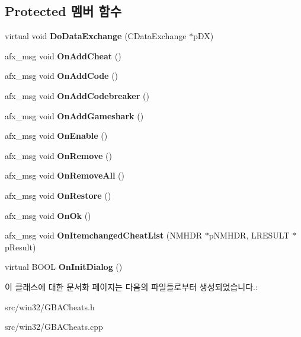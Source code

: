 \subsection*{Protected 멤버 함수}
\begin{DoxyCompactItemize}
\item 
\mbox{\label{class_g_b_a_cheat_list_ad55813b6695ea45723684f1346efb938}} 
virtual void {\bfseries Do\+Data\+Exchange} (C\+Data\+Exchange $\ast$p\+DX)
\item 
\mbox{\label{class_g_b_a_cheat_list_a9e6ac22e19feef95ecd21881324e5d49}} 
afx\+\_\+msg void {\bfseries On\+Add\+Cheat} ()
\item 
\mbox{\label{class_g_b_a_cheat_list_a6ac13ccfe979786032de5a836e9c35a6}} 
afx\+\_\+msg void {\bfseries On\+Add\+Code} ()
\item 
\mbox{\label{class_g_b_a_cheat_list_a06eeb598a3bfdccf747014a7d3c996dc}} 
afx\+\_\+msg void {\bfseries On\+Add\+Codebreaker} ()
\item 
\mbox{\label{class_g_b_a_cheat_list_acd2892992a12237aa208dbfe53331da2}} 
afx\+\_\+msg void {\bfseries On\+Add\+Gameshark} ()
\item 
\mbox{\label{class_g_b_a_cheat_list_a22de639a60de7c74ffd176281df51b14}} 
afx\+\_\+msg void {\bfseries On\+Enable} ()
\item 
\mbox{\label{class_g_b_a_cheat_list_ae8a0358fd127292dda615a647a6f36c9}} 
afx\+\_\+msg void {\bfseries On\+Remove} ()
\item 
\mbox{\label{class_g_b_a_cheat_list_a41727af1d277cd0ac71b80e992b55ec9}} 
afx\+\_\+msg void {\bfseries On\+Remove\+All} ()
\item 
\mbox{\label{class_g_b_a_cheat_list_a0fe16ba1b246f6baa133926505681012}} 
afx\+\_\+msg void {\bfseries On\+Restore} ()
\item 
\mbox{\label{class_g_b_a_cheat_list_a32b955a45061f6e2fbeb513341b90bff}} 
afx\+\_\+msg void {\bfseries On\+Ok} ()
\item 
\mbox{\label{class_g_b_a_cheat_list_a64182036127e2c73d0c79706cc1f2d1e}} 
afx\+\_\+msg void {\bfseries On\+Itemchanged\+Cheat\+List} (N\+M\+H\+DR $\ast$p\+N\+M\+H\+DR, L\+R\+E\+S\+U\+LT $\ast$p\+Result)
\item 
\mbox{\label{class_g_b_a_cheat_list_ae6cfd528dfdae4f9e7f64df50a0771ed}} 
virtual B\+O\+OL {\bfseries On\+Init\+Dialog} ()
\end{DoxyCompactItemize}


이 클래스에 대한 문서화 페이지는 다음의 파일들로부터 생성되었습니다.\+:\begin{DoxyCompactItemize}
\item 
src/win32/G\+B\+A\+Cheats.\+h\item 
src/win32/G\+B\+A\+Cheats.\+cpp\end{DoxyCompactItemize}
